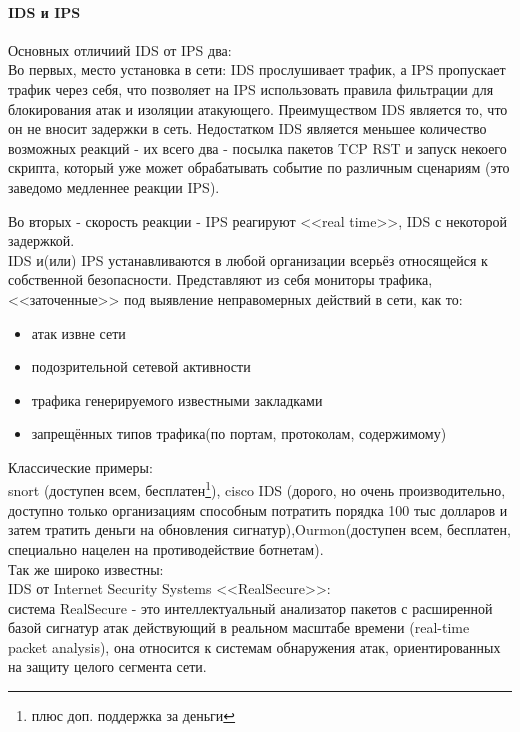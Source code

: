 \paragraph{IDS и IPS\\}

Основных отличиий IDS от IPS  два:\\

Во первых, место установка в сети: IDS прослушивает трафик, а
IPS пропускает трафик через себя, что позволяет на IPS использовать правила фильтрации
для блокирования атак и изоляции атакующего. Преимуществом IDS является то, что он не
вносит задержки в сеть. Недостатком IDS является меньшее количество возможных реакций -
их всего два - посылка пакетов TCP RST и запуск некоего скрипта, который уже может
обрабатывать событие по различным сценариям (это заведомо медленнее реакции IPS).

Во вторых - скорость реакции - IPS реагируют <<real time>>, IDS с некоторой задержкой.\\

IDS и(или) IPS устанавливаются в любой организации всерьёз относящейся к собственной
безопасности. Представляют из себя мониторы трафика, <<заточенные>> под
выявление неправомерных действий в сети, как то:

\begin{itemize}
\item{атак извне сети}
\item{подозрительной сетевой активности}
\item{трафика генерируемого известными закладками}
\item{запрещённых типов трафика(по портам, протоколам, содержимому)}
\end{itemize}

Классические примеры:\\
snort (доступен всем, бесплатен\footnote{плюс доп. поддержка за деньги}),
cisco IDS (дорого, но очень производительно, доступно только организациям
способным потратить порядка 100 тыс долларов и затем тратить деньги на
обновления сигнатур),Ourmon(доступен всем, бесплатен, специально нацелен на
противодействие ботнетам).\\
Так же широко известны:\\ IDS от Internet Security Systems
<<RealSecure>>:\\
система RealSecure - это интеллектуальный анализатор пакетов с расширенной
базой сигнатур атак действующий в реальном масштабе времени (real-time packet
 analysis), она относится к системам обнаружения атак, ориентированных на защиту
 целого сегмента сети.\\

